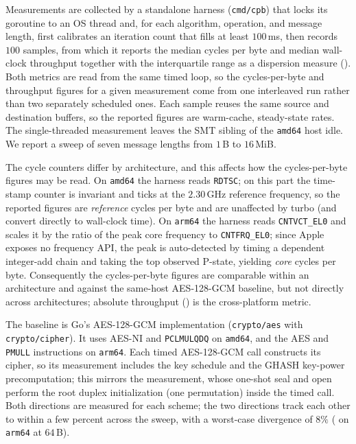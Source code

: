 Measurements are collected by a standalone harness (\texttt{cmd/cpb}) that locks
its goroutine to an OS thread and, for each algorithm, operation, and message
length, first calibrates an iteration count that fills at least $100$\,ms, then
records $100$ samples, from which it reports the median cycles per byte and
median wall-clock throughput together with the interquartile range as a
dispersion measure (). Both metrics are read from the same timed loop, so the
cycles-per-byte and throughput figures for a given measurement come from one
interleaved run rather than two separately scheduled ones. Each sample reuses the
same source and destination buffers, so the reported figures are warm-cache,
steady-state rates. The single-threaded measurement leaves the SMT sibling of the
\texttt{amd64} host idle. We report a sweep of seven message lengths from $1$\,B
to $16$\,MiB.

The cycle counters differ by architecture, and this affects how the
cycles-per-byte figures may be read. On \texttt{amd64} the harness reads
\texttt{RDTSC}; on this part the time-stamp counter is invariant and ticks at the
$2.30$\,GHz reference frequency, so the reported figures are \emph{reference}
cycles per byte and are unaffected by turbo (and convert directly to wall-clock
time). On \texttt{arm64} the harness reads \texttt{CNTVCT\_EL0} and scales it by
the ratio of the peak core frequency to \texttt{CNTFRQ\_EL0}; since Apple exposes
no frequency API, the peak is auto-detected by timing a dependent integer-add
chain and taking the top observed P-state, yielding \emph{core} cycles per byte.
Consequently the cycles-per-byte figures are comparable within an architecture
and against the same-host AES-128-GCM baseline, but not directly across
architectures; absolute throughput () is the cross-platform
metric.

The baseline is Go's AES-128-GCM implementation
(\texttt{crypto/\allowbreak aes} with \texttt{crypto/\allowbreak cipher}).
It uses AES-NI and \texttt{PCLMULQDQ} on \texttt{amd64}, and the AES
and \texttt{PMULL} instructions on \texttt{arm64}.
Each timed AES-128-GCM call constructs its cipher, so its measurement includes
the key schedule and the GHASH key-power precomputation; this mirrors the
\TW{} measurement, whose one-shot seal and open perform the root duplex
initialization (one permutation) inside the timed call. Both directions are
measured for each scheme; the two directions track each other to within a few
percent across the sweep, with a worst-case divergence of $8\%$ (\TW{} on
\texttt{arm64} at $64$\,B).

